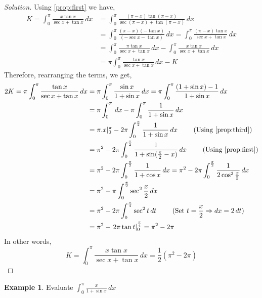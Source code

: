 \documentclass{book}
\theoremstyle{definition}
\newtheorem{example}{Example}[section]
\newenvironment{solution}
    {\begin{proof}[Solution]}
    {\end{proof}}
\begin{document}
\begin{solution}
Using \ref{prop:first} we have,
\begin{align*}
K=\int_0^{\pi}\frac{x\tan x}{\sec x+\tan x}\,dx &= \int_0^{\pi}\frac{(\pi-x)\tan (\pi-x)}{\sec (\pi-x)+\tan (\pi-x)}\,dx \\
&= \int_0^{\pi}\frac{(\pi-x)(-\tan x)}{(-\sec x-\tan x)}\,dx = \int_0^{\pi}\frac{(\pi-x)\tan x}{\sec x+\tan x}\,dx \\
&= \int_0^{\pi}\frac{\pi\tan x}{\sec x+\tan x}\,dx-\int_0^{\pi}\frac{x\tan x}{\sec x+\tan x}\,dx \\
&= \pi\int_0^{\pi}\frac{\tan x}{\sec x+\tan x}\,dx - K
\end{align*}
Therefore, rearranging the terms, we get,
\begin{align*}
    2K = \pi\int_0^{\pi}\frac{\tan x}{\sec x+\tan x}\,dx &= \pi\int_0^{\pi}\frac{\sin x}{1+\sin x}\,dx = \pi\int_0^{\pi}\frac{(1+\sin x)-1}{1+\sin x}\,dx \\
    &= \pi\int_0^{\pi}\,dx-\pi\int_0^{\pi}\frac{1}{1+\sin x}\,dx \\
    &= \pi.x\vert_0^{\pi}-2\pi\displaystyle\int_0^{\frac{\pi}{2}}\frac{1}{1+\sin x}\,dx \qquad \text{ (Using \ref{prop:third})} \\
    &= \pi^2-2\pi\displaystyle\int_0^{\frac{\pi}{2}}\frac{1}{1+\sin (\frac{\pi}{2}-x)}\,dx \qquad \text{ (Using \ref{prop:first})} \\
    &= \pi^2-2\pi\displaystyle\int_0^{\frac{\pi}{2}}\frac{1}{1+\cos x}\,dx = \pi^2-2\pi\displaystyle\int_0^{\frac{\pi}{2}}\frac{1}{2\cos^2\frac{x}{2}}\,dx \\
    &= \pi^2-\pi\displaystyle\int_0^{\frac{\pi}{2}}\sec^2\frac{x}{2}\,dx \\
    &= \pi^2-2\pi\displaystyle\int_0^{\frac{\pi}{4}}\sec^2 t\,dt \qquad \text{ (Set $t=\frac{x}{2} \Rightarrow dx = 2\,dt$)} \\
    &= \pi^2-\left.2\pi \tan t\right\vert_0^{\frac{\pi}{4}} = \pi^2-2\pi
\end{align*}
In other words,
\[
K=\int_0^{\pi}\frac{x\tan x}{\sec x+\tan x}\,dx=\frac{1}{2}(\pi^2-2\pi)
\]
\end{solution}

\begin{example}
Evaluate $\displaystyle\int_0^{\pi}\frac{x}{1+\sin x}\,dx$    
\end{example}
\end{document}
